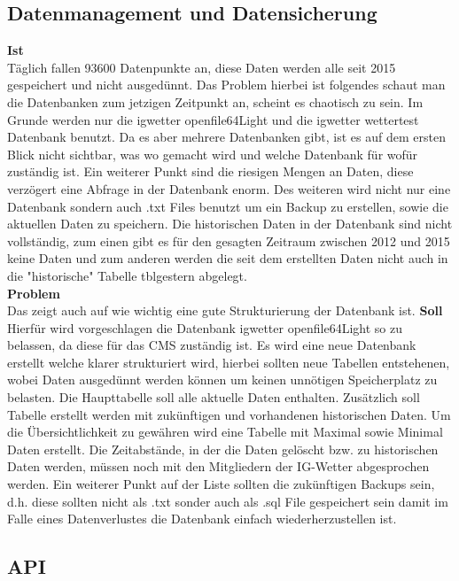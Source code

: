 \subsection{Datenmanagement und Datensicherung}
\textbf{Ist}\\
Täglich fallen 93600 Datenpunkte an, diese Daten werden alle seit 2015 gespeichert und nicht ausgedünnt. Das Problem hierbei ist folgendes schaut man die Datenbanken zum jetzigen Zeitpunkt an, scheint es chaotisch zu sein. Im Grunde werden nur die igwetter openfile64Light und die igwetter wettertest Datenbank benutzt. Da es aber mehrere Datenbanken gibt,  ist es auf dem ersten Blick nicht sichtbar, was wo gemacht wird und welche Datenbank für wofür zuständig ist. Ein weiterer Punkt sind die riesigen Mengen an Daten, diese verzögert eine Abfrage in der Datenbank enorm. Des weiteren wird nicht nur eine Datenbank sondern auch .txt Files benutzt um ein Backup zu erstellen, sowie die aktuellen Daten zu speichern. Die historischen Daten in der Datenbank sind nicht vollständig, zum einen gibt es für den gesagten Zeitraum zwischen 2012 und 2015 keine Daten und zum anderen werden die seit dem erstellten Daten nicht auch in die "historische" Tabelle tblgestern abgelegt.\\
\textbf{Problem}\\
Das zeigt auch auf wie wichtig eine gute Strukturierung der Datenbank ist. 
\textbf{Soll}\\
Hierfür wird vorgeschlagen die Datenbank igwetter openfile64Light so zu belassen, da diese für das CMS zuständig ist. Es wird eine neue Datenbank erstellt welche klarer strukturiert wird, hierbei sollten neue Tabellen entstehenen, wobei Daten ausgedünnt werden können um keinen unnötigen Speicherplatz zu belasten. Die Haupttabelle soll alle aktuelle Daten enthalten. Zusätzlich soll Tabelle erstellt werden mit zukünftigen und vorhandenen historischen Daten. Um die Übersichtlichkeit zu gewähren wird eine Tabelle mit Maximal sowie Minimal Daten erstellt. Die Zeitabstände, in der die Daten gelöscht bzw. zu historischen Daten werden, müssen noch mit den Mitgliedern der IG-Wetter abgesprochen werden. Ein weiterer Punkt auf der Liste sollten die zukünftigen Backups sein, d.h. diese sollten nicht als .txt sonder auch als .sql File gespeichert sein damit im Falle eines Datenverlustes die Datenbank einfach wiederherzustellen ist.

\subsection{API}



